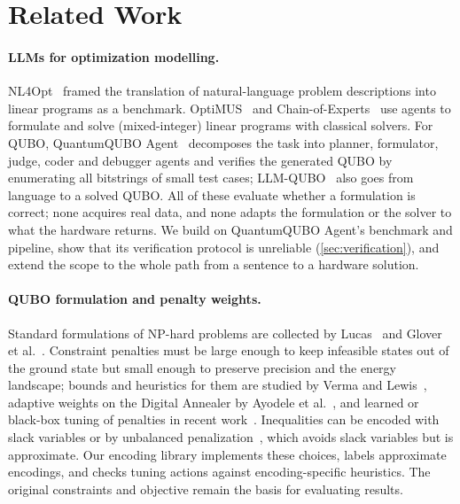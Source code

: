 \section{Related Work}
\label{sec:related}

\paragraph{LLMs for optimization modelling.}
NL4Opt~\citep{ramamonjison2023nl4opt} framed the translation of natural-language problem descriptions into linear
programs as a benchmark. OptiMUS~\citep{ahmaditeshnizi2024optimus} and Chain-of-Experts~\citep{xiao2024chainofexperts}
use agents to formulate and solve (mixed-integer) linear programs with classical solvers. For QUBO, QuantumQUBO
Agent~\citep{mondal2026quantumqubo} decomposes the task into planner, formulator, judge, coder and debugger agents
and verifies the generated QUBO by enumerating all bitstrings of small test cases;
LLM-QUBO~\citep{llmqubo2025} also goes from language to a solved QUBO. All of these evaluate whether a formulation
is correct; none acquires real data, and none adapts the formulation or the solver to what the hardware returns.
We build on QuantumQUBO Agent's benchmark and pipeline, show that its verification protocol is unreliable
(\cref{sec:verification}), and extend the scope to the whole path from a sentence to a hardware solution.

\paragraph{QUBO formulation and penalty weights.}
Standard formulations of NP-hard problems are collected by Lucas~\citep{lucas2014ising} and Glover et
al.~\citep{glover2019tutorial}. Constraint penalties must be large enough to keep infeasible states out of the
ground state but small enough to preserve precision and the energy landscape; bounds and heuristics for them are
studied by Verma and Lewis~\citep{verma2020penalty}, adaptive weights on the Digital Annealer by Ayodele et
al.~\citep{ayodele2022penalty}, and learned or black-box tuning of penalties in recent
work~\citep{penaltyml2025bisection,formulationautotuning2026}. Inequalities can be encoded with slack variables or
by unbalanced penalization~\citep{montanez2024unbalanced}, which avoids slack variables but is approximate. Our
encoding library implements these choices, labels approximate encodings, and checks tuning actions against
encoding-specific heuristics. The original constraints and objective remain the basis for evaluating results.

